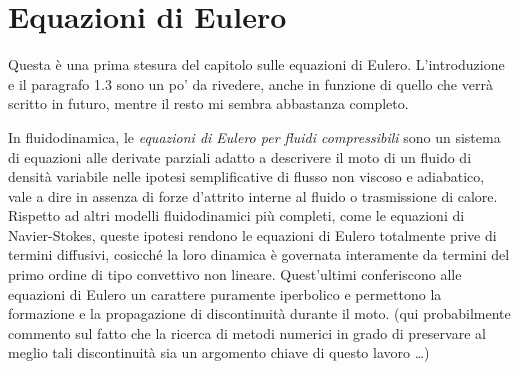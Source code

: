 \chapter{Equazioni di Eulero}

Questa è una prima stesura del capitolo sulle equazioni di Eulero.
L'introduzione e il paragrafo 1.3 sono un po' da rivedere,
anche in funzione di quello che verrà scritto in futuro,
mentre il resto mi sembra abbastanza completo.
\vspace{1em}

%	
%	
%	
%	
%	
%	

In fluidodinamica, le \emph{equazioni di Eulero per fluidi compressibili}
sono un sistema di equazioni alle derivate parziali
adatto a descrivere il moto di un fluido di densità variabile nelle ipotesi
semplificative di flusso non viscoso e adiabatico, vale a dire
in assenza di forze d'attrito interne al fluido o trasmissione di calore.
Rispetto ad altri modelli fluidodinamici più completi,
come le equazioni di Navier-Stokes, queste ipotesi rendono
le equazioni di Eulero totalmente prive di termini diffusivi,
cosicché la loro dinamica è governata interamente da termini del primo ordine
di tipo convettivo non lineare. Quest'ultimi
conferiscono alle equazioni di Eulero un carattere puramente iperbolico
e permettono la formazione e la propagazione di discontinuità durante il moto.
(qui probabilmente commento sul fatto che la ricerca di metodi numerici in grado di
preservare al meglio tali discontinuità sia un argomento chiave
di questo lavoro \dots)

